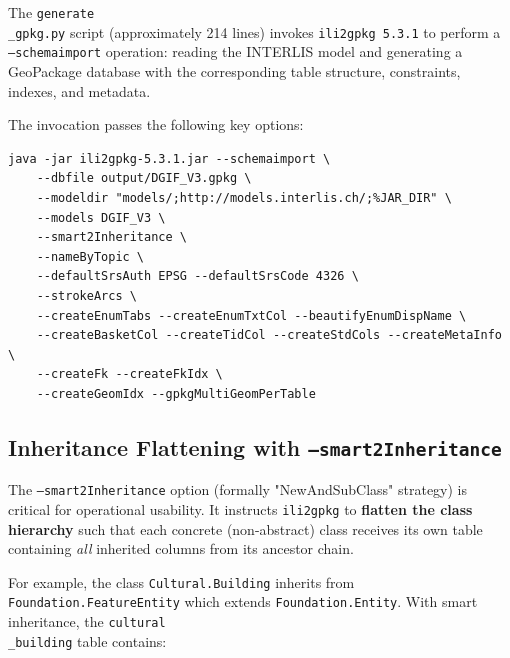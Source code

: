 \documentclass[conference]{IEEEtran}
\begin{document}
The \texttt{generate\\_gpkg.py} script (approximately 214 lines) invokes \texttt{ili2gpkg 5.3.1} to perform a \texttt{--schemaimport} operation: reading the INTERLIS model and generating a GeoPackage database with the corresponding table structure, constraints, indexes, and metadata.

The invocation passes the following key options:

\begin{lstlisting}
java -jar ili2gpkg-5.3.1.jar --schemaimport \
    --dbfile output/DGIF_V3.gpkg \
    --modeldir "models/;http://models.interlis.ch/;%JAR_DIR" \
    --models DGIF_V3 \
    --smart2Inheritance \
    --nameByTopic \
    --defaultSrsAuth EPSG --defaultSrsCode 4326 \
    --strokeArcs \
    --createEnumTabs --createEnumTxtCol --beautifyEnumDispName \
    --createBasketCol --createTidCol --createStdCols --createMetaInfo \
    --createFk --createFkIdx \
    --createGeomIdx --gpkgMultiGeomPerTable
\end{lstlisting}


\subsection{Inheritance Flattening with \texttt{--smart2Inheritance}}

The \texttt{--smart2Inheritance} option (formally "NewAndSubClass" strategy) is critical for operational usability. It instructs \texttt{ili2gpkg} to \textbf{flatten the class hierarchy} such that each concrete (non-abstract) class receives its own table containing \textit{all} inherited columns from its ancestor chain.

For example, the class \texttt{Cultural.Building} inherits from \texttt{Foundation.FeatureEntity} which extends \texttt{Foundation.Entity}. With smart inheritance, the \texttt{cultural\\_building} table contains:
\end{document}
